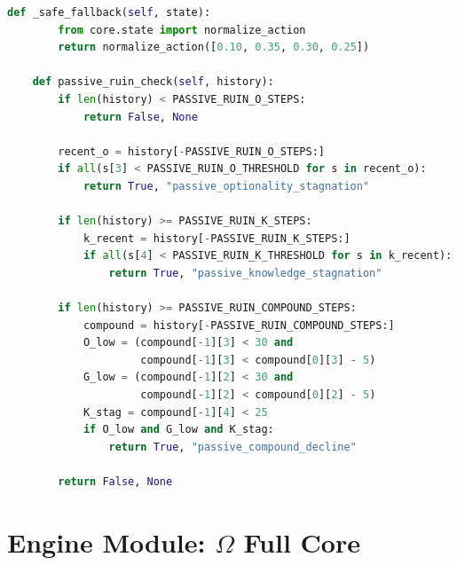 \begin{lstlisting}[language=Python,basicstyle=\ttfamily\scriptsize,frame=single]
    def _safe_fallback(self, state):
        from core.state import normalize_action
        return normalize_action([0.10, 0.35, 0.30, 0.25])

    def passive_ruin_check(self, history):
        if len(history) < PASSIVE_RUIN_O_STEPS:
            return False, None

        recent_o = history[-PASSIVE_RUIN_O_STEPS:]
        if all(s[3] < PASSIVE_RUIN_O_THRESHOLD for s in recent_o):
            return True, "passive_optionality_stagnation"

        if len(history) >= PASSIVE_RUIN_K_STEPS:
            k_recent = history[-PASSIVE_RUIN_K_STEPS:]
            if all(s[4] < PASSIVE_RUIN_K_THRESHOLD for s in k_recent):
                return True, "passive_knowledge_stagnation"

        if len(history) >= PASSIVE_RUIN_COMPOUND_STEPS:
            compound = history[-PASSIVE_RUIN_COMPOUND_STEPS:]
            O_low = (compound[-1][3] < 30 and
                     compound[-1][3] < compound[0][3] - 5)
            G_low = (compound[-1][2] < 30 and
                     compound[-1][2] < compound[0][2] - 5)
            K_stag = compound[-1][4] < 25
            if O_low and G_low and K_stag:
                return True, "passive_compound_decline"

        return False, None
\end{lstlisting}

\section{Engine Module: $\Omega$ Full Core}
\label{sec:impl-omega-full}

